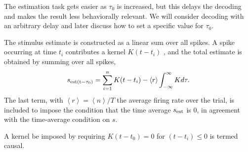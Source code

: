 \begin{rem}
  The estimation task gets easier
as $\tau_{0}$ is increased, but this delays the decoding and makes the result less
behaviorally relevant. We will consider decoding with an arbitrary delay
and later discuss how to set a specific value for $\tau_0$.
\end{rem}

\begin{prop}
  \label{prop:Spike-Train stimulus estimate}
  The stimulus estimate is constructed as a linear sum over all
  spikes. A spike occurring at time $t_{i}$ contributes a kernel
  $K(t-t_{i})$ , and the total estimate is obtained by summing over
  all spikes,
  \begin{equation}
    \label{eq:3.51}
    s_{\rm{est}(t-\tau_{0})}=\sum\limits_{i=1}^{n}K(t-t_i)-\left\langle r \right\rangle\int_{-\infty}^{\infty}K d\tau.
  \end{equation}
  The last term, with $\left\langle r \right\rangle=\left\langle n \right\rangle/T$ the average firing rate over the trial, is included to impose the condition that the time average $s_{\rm{est}}$ is $0$, in agreement with the time-average condition on $s$.
\end{prop}

\begin{defn}
  A kernel be imposed
by requiring $K(t-t_0)=0$ for $(t-t_i)\leq 0$ is termed causal.
\end{defn}

